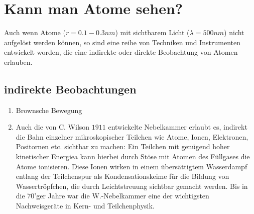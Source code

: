 \section{Kann man Atome sehen?} %
\label{sec:Kann man Atome sehen}
Auch wenn Atome ($r=0.1 - 0.3 nm$) mit sichtbarem Licht ($\lambda = 500nm$)
nicht aufgelöst werden können, so sind eine reihe von Techniken und
Instrumenten entwickelt worden, die eine indirekte oder direkte Beobachtung von
Atomen erlauben.
\subsection{indirekte Beobachtungen} %
\label{sub:indirekte_Beobachtungen}
\begin{enumerate}
    \item Brownsche Bewegung
    \item Auch die von C. Wilson $1911$ entwickelte Nebelkammer erlaubt es,
    indirekt die Bahn einzelner mikroskopischer Teilchen wie Atome, Ionen,
    Elektronen, Positornen etc. sichtbar zu machen: Ein Teilchen mit genügend
    hoher kinetischer Energiea kann hierbei durch Stöse mit Atomen des
    Füllgases die Atome ionisieren. Diese Ionen wirken in einem übersättigtem
    Wasserdampf entlang der Teilchenspur als Kondensationskeime für die Bildung
    von Wassertröpfchen, die durch Leichtstreuung sichtbar gemacht werden. Bis
    in die $70$'ger Jahre war die W.-Nebelkammer eine der wichtigsten
    Nachweisgeräte in Kern- und Teilchenphysik.
\end{enumerate}
